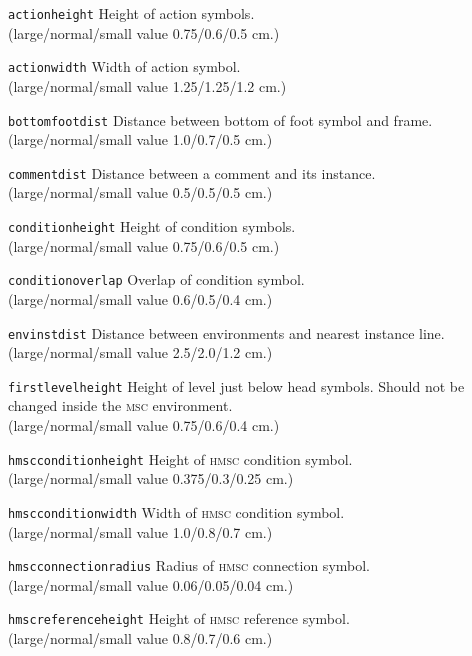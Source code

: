 \documentclass[a4paper]{article}
\newcommand{\cmd}[1]{\texttt{\bslash #1}}
\newcommand{\acro}[1]{{\scshape\lowercase{#1}}}
\newcommand\MSC{\acro{MSC}}
\newcommand\HMSC{\acro{HMSC}}
\newcommand{\lnsvalue}[3]{large/normal/small value #1/#2/#3}
\newenvironment{defs}{%
  \begin{list}{}%
              {\setlength{\labelwidth}{0pt}%
               \setlength{\labelsep}{1em}%
               \setlength{\leftmargin}{1em}%
               \setlength{\parsep}{1ex}%
               \setlength{\listparindent}{0pt}%
               \setlength{\rightmargin}{0pt}%
               \renewcommand{\makelabel}[1]{##1}%
               \raggedright%
              }%
  }{%
  \end{list}}
\begin{document}
\begin{defs}

\item[\cmd{actionheight}]
Height of action symbols.\\
(\lnsvalue{0.75}{0.6}{0.5} cm.)

\item[\cmd{actionwidth}]
Width of action symbol.\\
(\lnsvalue{1.25}{1.25}{1.2} cm.)

\item[\cmd{bottomfootdist}]
Distance between bottom of foot symbol and frame.\\
(\lnsvalue{1.0}{0.7}{0.5} cm.)

\item[\cmd{commentdist}]
Distance between a comment and its instance.\\
(\lnsvalue{0.5}{0.5}{0.5} cm.)

\item[\cmd{conditionheight}]
Height of condition symbols.\\
(\lnsvalue{0.75}{0.6}{0.5} cm.)

\item[\cmd{conditionoverlap}]
Overlap of condition symbol.\\
(\lnsvalue{0.6}{0.5}{0.4} cm.)

\item[\cmd{envinstdist}]
Distance between environments and nearest instance line.\\
(\lnsvalue{2.5}{2.0}{1.2} cm.)

\item[\cmd{firstlevelheight}] Height of level just below head
symbols. Should not be changed inside the \MSC{} environment.\\
(\lnsvalue{0.75}{0.6}{0.4} cm.)

\item[\cmd{hmscconditionheight}]
Height of \HMSC{} condition symbol.\\
(\lnsvalue{0.375}{0.3}{0.25} cm.)

\item[\cmd{hmscconditionwidth}]
Width of \HMSC{} condition symbol.\\
(\lnsvalue{1.0}{0.8}{0.7} cm.)

\item[\cmd{hmscconnectionradius}]
Radius of \HMSC{} connection symbol.\\
(\lnsvalue{0.06}{0.05}{0.04} cm.)

\item[\cmd{hmscreferenceheight}]
Height of \HMSC{} reference symbol.\\
(\lnsvalue{0.8}{0.7}{0.6} cm.)


\end{defs}
\end{document}
